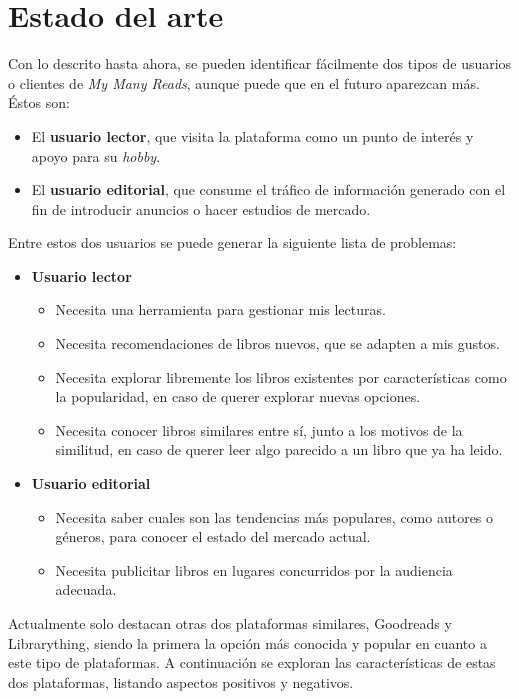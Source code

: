 \chapter{Estado del arte}
\label{Estado del arte}

Con lo descrito hasta ahora, se pueden identificar fácilmente dos tipos de usuarios o clientes de \textit{My Many Reads}, aunque puede que en el futuro aparezcan más. Éstos son:
\begin{itemize}
    \item El \textbf{usuario lector}, que visita la plataforma como un punto de interés y apoyo para su \textit{hobby}.
    \item El \textbf{usuario editorial}, que consume el tráfico de información generado con el fin de introducir anuncios o hacer estudios de mercado.
\end{itemize}

Entre estos dos usuarios se puede generar la siguiente lista de problemas:
\begin{itemize}
    \item \textbf{Usuario lector}
    \begin{itemize}
        \item Necesita una herramienta para gestionar mis lecturas.
        \item Necesita recomendaciones de libros nuevos, que se adapten a mis gustos.
        \item Necesita explorar libremente los libros existentes por características como la popularidad, en caso de querer explorar nuevas opciones.
        \item Necesita conocer libros similares entre sí, junto a los motivos de la similitud, en caso de querer leer algo parecido a un libro que ya ha leido.
    \end{itemize}
    \item \textbf{Usuario editorial}
    \begin{itemize}
        \item Necesita saber cuales son las tendencias más populares, como autores o géneros, para conocer el estado del mercado actual.
        \item Necesita publicitar libros en lugares concurridos por la audiencia adecuada.
    \end{itemize}
\end{itemize}


Actualmente solo destacan otras dos plataformas similares, Goodreads y Librarything, siendo la primera la opción más conocida y popular en cuanto a este tipo de plataformas. A continuación se exploran las características de estas dos plataformas, listando aspectos positivos y negativos.

